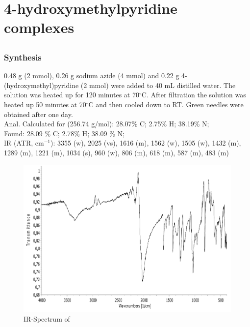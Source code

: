 \chapter{4-hydroxymethylpyridine complexes}
\section{}
\subsection{Synthesis}
0.48 g  (2 mmol), 0.26 g sodium azide (4 mmol) and 0.22 g 4-(hydroxymethyl)pyridine (2 mmol) were added to 40 mL distilled water. The solution was heated up for 120 minutes at 70$^\circ$C. After filtration the solution was heated up 50 minutes at 70$^\circ$C and then cooled down to RT. Green needles were obtained after one day.\\
 Anal. Calculated for  (256.74 g/mol): 28.07\% C; 2.75\% H; 38.19\% N;\\
Found: 28.09 \% C; 2.78\% H; 38.09 \% N;\\
IR (ATR, cm$^{-1}$): 3355 (w),  2025 (vs), 1616 (m), 1562 (w), 1505 (w), 1432 (m), 1289 (m), 1221 (m), 1034 (s), 960 (w), 806 (m), 618 (m), 587 (m), 483 (m)

\newpage
\begin{figure}[htpb!]
\centering
\includegraphics[width=1\textwidth]{figures/CuA4HOMP-IR.pdf}
\caption{IR-Spectrum of }
\end{figure}

